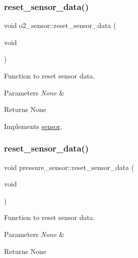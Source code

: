 \subsubsection{\texorpdfstring{reset\+\_\+sensor\+\_\+data()}{reset\_sensor\_data()}\hspace{0.1cm}{\footnotesize\ttfamily [1/2]}}
{\footnotesize\ttfamily void o2\+\_\+sensor\+::reset\+\_\+sensor\+\_\+data (\begin{DoxyParamCaption}\item[{void}]{ }\end{DoxyParamCaption})\hspace{0.3cm}{\ttfamily [virtual]}}



Function to reset sensor data. 


\begin{DoxyParams}{Parameters}
{\em None} & \\
\hline
\end{DoxyParams}
\begin{DoxyReturn}{Returns}
None 
\end{DoxyReturn}


Implements \hyperlink{classsensor_a71fccbf71cc771db4775443bf899a5d3}{sensor}.

\mbox{\label{group___ventilator_module_ga19fa695e059a50b732d54d1e4325ee99}} 
\subsubsection{\texorpdfstring{reset\+\_\+sensor\+\_\+data()}{reset\_sensor\_data()}\hspace{0.1cm}{\footnotesize\ttfamily [2/2]}}
{\footnotesize\ttfamily void pressure\+\_\+sensor\+::reset\+\_\+sensor\+\_\+data (\begin{DoxyParamCaption}\item[{void}]{ }\end{DoxyParamCaption})\hspace{0.3cm}{\ttfamily [virtual]}}



Function to reset sensor data. 


\begin{DoxyParams}{Parameters}
{\em None} & \\
\hline
\end{DoxyParams}
\begin{DoxyReturn}{Returns}
None 
\end{DoxyReturn}


